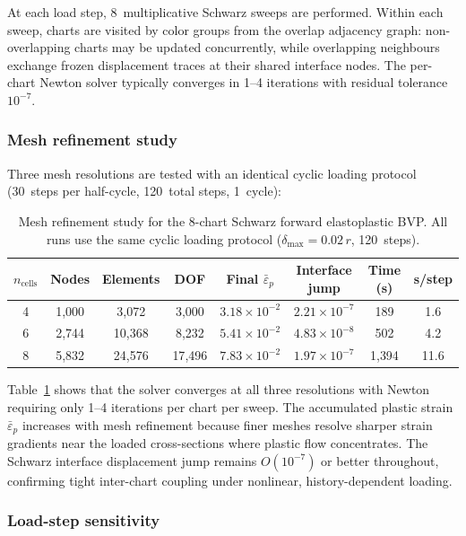 \documentclass[sort&compress]{svjour3} %
\begin{document}
At each load step, 8~multiplicative Schwarz sweeps are performed. Within each sweep, charts are visited by color groups from the overlap adjacency graph: non-overlapping charts may be updated concurrently, while overlapping neighbours exchange frozen displacement traces at their shared interface nodes. The per-chart Newton solver typically converges in 1--4 iterations with residual tolerance $10^{-7}$.

\subsubsection{Mesh refinement study}

Three mesh resolutions are tested with an identical cyclic loading protocol (30~steps per half-cycle, 120~total steps, 1~cycle):

\begin{table}[htbp]
\centering
\scriptsize
\setlength{\tabcolsep}{3pt}
\caption{Mesh refinement study for the 8-chart Schwarz forward elastoplastic BVP. All runs use the same cyclic loading protocol ($\delta_{\max}=0.02\,r$, 120~steps).}
\label{tab:bvp_mesh}
\begin{tabular}{cccccccc}
\toprule
$n_{\mathrm{cells}}$ & Nodes & Elements & DOF & Final $\bar{\varepsilon}_p$ & Interface jump & Time (s) & s/step \\
\midrule
4  & 1{,}000  & 3{,}072  & 3{,}000  & $3.18\times10^{-2}$ & $2.21\times10^{-7}$ & 189  & 1.6 \\
6  & 2{,}744  & 10{,}368 & 8{,}232  & $5.41\times10^{-2}$ & $4.83\times10^{-8}$ & 502  & 4.2 \\
8  & 5{,}832  & 24{,}576 & 17{,}496 & $7.83\times10^{-2}$ & $1.97\times10^{-7}$ & 1{,}394 & 11.6 \\
\bottomrule
\end{tabular}
\end{table}

Table~\ref{tab:bvp_mesh} shows that the solver converges at all three resolutions with Newton requiring only 1--4 iterations per chart per sweep. The accumulated plastic strain $\bar{\varepsilon}_p$ increases with mesh refinement because finer meshes resolve sharper strain gradients near the loaded cross-sections where plastic flow concentrates. The Schwarz interface displacement jump remains $O(10^{-7})$ or better throughout, confirming tight inter-chart coupling under nonlinear, history-dependent loading.

\subsubsection{Load-step sensitivity}
\end{document}
